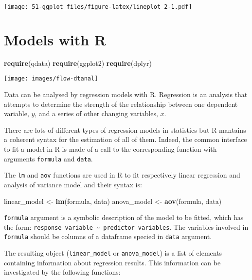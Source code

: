 \documentclass[]{book}
\newenvironment{Shaded}{\begin{snugshade}}{\end{snugshade}}
\newcommand{\KeywordTok}[1]{\textcolor[rgb]{0.13,0.29,0.53}{\textbf{{#1}}}}
\newcommand{\StringTok}[1]{\textcolor[rgb]{0.31,0.60,0.02}{{#1}}}
\newcommand{\NormalTok}[1]{{#1}}
\begin{document}
\texttt{[image: 51-ggplot\_files/figure-latex/lineplot\_2-1.pdf]}

\chapter{Models with R}\label{models-with-r}

\begin{Shaded}
\begin{Highlighting}[]
\KeywordTok{require}\NormalTok{(qdata)}
\KeywordTok{require}\NormalTok{(ggplot2)}
\KeywordTok{require}\NormalTok{(dplyr)}
\end{Highlighting}
\end{Shaded}

\texttt{[image: images/flow-dtanal]}

Data can be analysed by regression models with R. Regression is an
analysis that attempts to determine the strength of the relationship
between one dependent variable, \(y\), and a series of other changing
variables, \(x\).

There are lots of different types of regression models in statistics but
R mantains a coherent syntax for the estimation of all of them. Indeed,
the common interface to fit a model in R is made of a call to the
corresponding function with arguments \texttt{formula} and
\texttt{data}.

The \texttt{lm} and \texttt{aov} functions are used in R to fit
respectively linear regression and analysis of variance model and their
syntax is:

\begin{Shaded}
\begin{Highlighting}[]
\NormalTok{linear_model <-}\StringTok{ }\KeywordTok{lm}\NormalTok{(formula, data)}
\NormalTok{anova_model <-}\StringTok{ }\KeywordTok{aov}\NormalTok{(formula, data)}
\end{Highlighting}
\end{Shaded}

\texttt{formula} argument is a symbolic description of the model to be
fitted, which has the form:
\texttt{response\ variable\ ∼\ predictor\ variables}. The variables
involved in \texttt{formula} should be columns of a dataframe specied in
\texttt{data} argument.

The resulting object (\texttt{linear\_model} or \texttt{anova\_model})
is a list of elements containing information about regression results.
This information can be investigated by the following functions:
\end{document}
